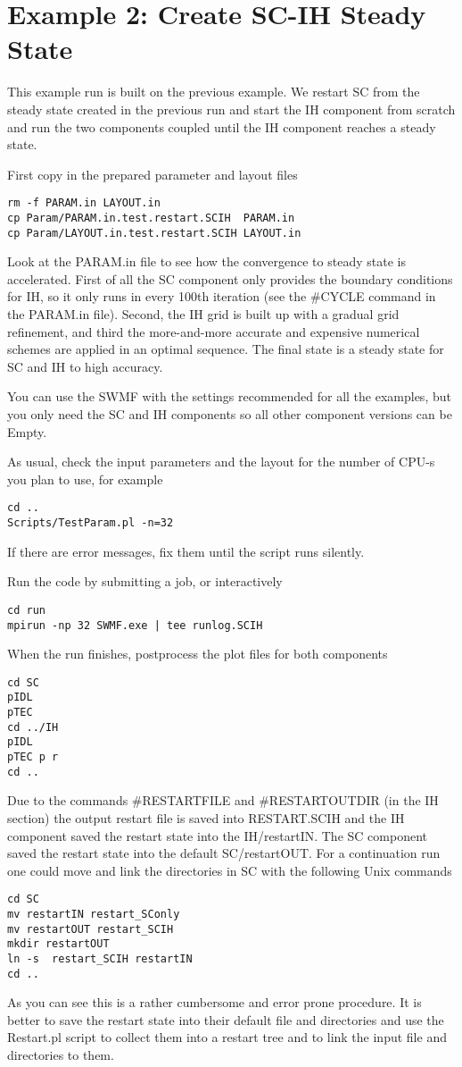 \section{Example 2: Create SC-IH Steady State}

This example run is built on the previous example. We restart SC from the
steady state created in the previous run and start the IH component from 
scratch and run the two components coupled until the IH component reaches
a steady state. 

First copy in the prepared parameter and layout files
\begin{verbatim}
rm -f PARAM.in LAYOUT.in
cp Param/PARAM.in.test.restart.SCIH  PARAM.in
cp Param/LAYOUT.in.test.restart.SCIH LAYOUT.in
\end{verbatim}
Look at the PARAM.in file to see how the convergence to 
steady state is accelerated.
First of all the SC component only provides the boundary conditions for IH,
so it only runs in every 100th iteration (see the \#CYCLE command in
the PARAM.in file). Second, the IH grid is built
up with a gradual grid refinement, and third the 
more-and-more accurate and expensive numerical schemes are 
applied in an optimal sequence. The final state
is a steady state for SC and IH to high accuracy. 

You can use the SWMF with the settings recommended for all the examples,
but you only need the SC and IH components so 
all other component versions can be Empty.

As usual, check the input parameters and the layout for the
number of CPU-s you plan to use, for example
\begin{verbatim}
cd ..
Scripts/TestParam.pl -n=32
\end{verbatim}
If there are error messages, fix them until the script runs silently.

Run the code by submitting a job, or interactively
\begin{verbatim}
cd run
mpirun -np 32 SWMF.exe | tee runlog.SCIH
\end{verbatim}
When the run finishes, postprocess the plot files for both components
\begin{verbatim}
cd SC
pIDL
pTEC
cd ../IH
pIDL
pTEC p r
cd ..
\end{verbatim}
Due to the commands \#RESTARTFILE and \#RESTARTOUTDIR (in the IH section)
the output restart file is saved into RESTART.SCIH and the IH component
saved the restart state into the IH/restartIN. The SC component saved
the restart state into the default SC/restartOUT. For a continuation run
one could move and link the directories in SC with the following Unix commands
\begin{verbatim}
cd SC
mv restartIN restart_SConly
mv restartOUT restart_SCIH
mkdir restartOUT
ln -s  restart_SCIH restartIN
cd ..
\end{verbatim}
As you can see this is a rather cumbersome and error prone procedure.
It is better to save the restart state into their default file and
directories and use the Restart.pl script to collect them into 
a restart tree and to link the input file and directories to them.

